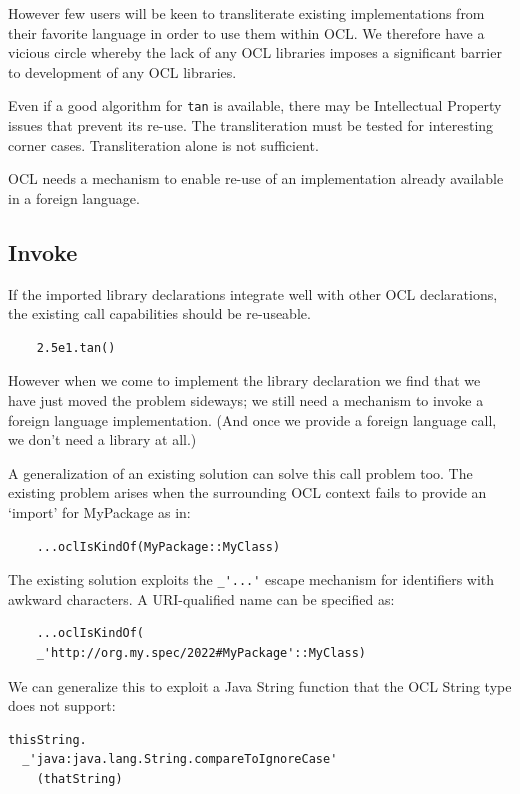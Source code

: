 \documentclass[sigconf]{acmart}
\begin{document}
However few users will be keen to transliterate existing implementations from their favorite language in order to use them within OCL. We therefore have a vicious circle whereby the lack of any OCL libraries imposes a significant barrier to development of any OCL libraries.

Even if a good algorithm for \verb|tan| is available, there may be Intellectual Property issues that prevent its re-use. The transliteration must be tested for interesting corner cases.  Transliteration alone is not sufficient.

OCL needs a mechanism to enable re-use of an implementation already available in a foreign language.

\subsection{Invoke}\label{Call}  

If the imported library declarations integrate well with other OCL declarations, the existing call capabilities should be re-useable.

\begin{verbatim}
	2.5e1.tan()
\end{verbatim} 

However when we come to implement the library declaration we find that we have just moved the problem sideways; we still need a mechanism to invoke a foreign language implementation.
(And once we provide a foreign language call, we don't need a library at all.)

A generalization of an existing solution can solve this call problem too.
The existing problem arises when the surrounding OCL context fails to provide an `import' for MyPackage as in:

\begin{verbatim}
    ...oclIsKindOf(MyPackage::MyClass)
\end{verbatim} 

The existing solution exploits the \verb|_'...'| escape mechanism for identifiers with awkward characters. A URI-qualified name can be specified as:

\begin{verbatim}
    ...oclIsKindOf(
    _'http://org.my.spec/2022#MyPackage'::MyClass)
\end{verbatim} 

We can generalize this to exploit a Java String function that the OCL String type does not support: 

\begin{verbatim}
thisString.
  _'java:java.lang.String.compareToIgnoreCase'
    (thatString)
\end{verbatim} 
\end{document}

